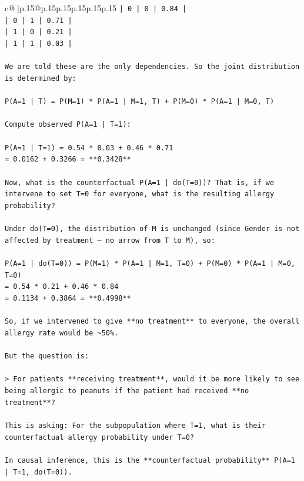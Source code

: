 \documentclass{article}
\begin{document}
{\begin{supertabular}{c@{$\;$}|p{.15\linewidth}@{}p{.15\linewidth}p{.15\linewidth}p{.15\linewidth}p{.15\linewidth}p{.15\linewidth}}
{{{\texttt{| 0 | 0 | 0.84 |} \\
\texttt{| 0 | 1 | 0.71 |} \\
\texttt{| 1 | 0 | 0.21 |} \\
\texttt{| 1 | 1 | 0.03 |} \\
\\ 
\texttt{We are told these are the only dependencies. So the joint distribution is determined by:} \\
\\ 
\texttt{P(A=1 | T) = P(M=1) * P(A=1 | M=1, T) + P(M=0) * P(A=1 | M=0, T)} \\
\\ 
\texttt{Compute observed P(A=1 | T=1):} \\
\\ 
\texttt{P(A=1 | T=1) = 0.54 * 0.03 + 0.46 * 0.71  } \\
\texttt{= 0.0162 + 0.3266 = **0.3428**} \\
\\ 
\texttt{Now, what is the counterfactual P(A=1 | do(T=0))? That is, if we intervene to set T=0 for everyone, what is the resulting allergy probability?} \\
\\ 
\texttt{Under do(T=0), the distribution of M is unchanged (since Gender is not affected by treatment — no arrow from T to M), so:} \\
\\ 
\texttt{P(A=1 | do(T=0)) = P(M=1) * P(A=1 | M=1, T=0) + P(M=0) * P(A=1 | M=0, T=0)  } \\
\texttt{= 0.54 * 0.21 + 0.46 * 0.84  } \\
\texttt{= 0.1134 + 0.3864 = **0.4998**} \\
\\ 
\texttt{So, if we intervened to give **no treatment** to everyone, the overall allergy rate would be \textasciitilde{}50\%.} \\
\\ 
\texttt{But the question is:} \\
\\ 
\texttt{> For patients **receiving treatment**, would it be more likely to see being allergic to peanuts if the patient had received **no treatment**?} \\
\\ 
\texttt{This is asking: For the subpopulation where T=1, what is their counterfactual allergy probability under T=0?} \\
\\ 
\texttt{In causal inference, this is the **counterfactual probability** P(A=1 | T=1, do(T=0)).} \\
}}}
\end{supertabular}}
\end{document}

